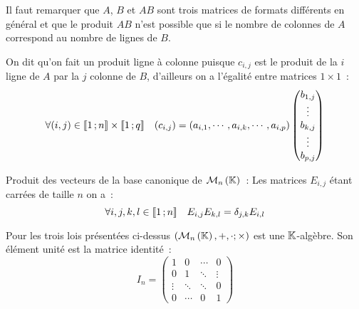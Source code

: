 Il faut remarquer que $A$, $B$ et $AB$ sont trois matrices de formats différents en général et que le produit $AB$ n'est possible que si le nombre de colonnes de $A$ correspond au nombre de lignes de $B$.

On dit qu'on fait un produit ligne à colonne puisque $c_{i,j}$ est le produit de la $i$\ieme{} ligne de $A$ par la $j$\ieme{} colonne de $B$, d'ailleurs on a l'égalité entre matrices $1 \times 1$~:
\begin{equation}
	\forall (i,j) \in \mathopen{\llbracket}1\mathclose{}\mathpunct{};n\mathclose{\rrbracket} \times \mathopen{\llbracket}1\mathclose{}\mathpunct{};q\mathclose{\rrbracket} \quad (c_{i,j}) = (a_{i,1}, \cdots, a_{i,k}, \cdots, a_{i,p}) \begin{pmatrix} b_{1,j} \\ \vdots \\b_{k,j} \\ \vdots \\b_{p,j} \end{pmatrix}
\end{equation}

Produit des vecteurs de la base canonique de $\mathcal{M}_{n}\left(\mathbb{K}\right)$~: Les matrices $E_{i,j}$ étant carrées de taille $n$ on a~:
\begin{equation}
	\forall i,j,k,l \in \mathopen{\llbracket}1\mathclose{}\mathpunct{};n\mathclose{\rrbracket} \quad E_{i,j}E_{k,l} = \delta_{j,k} E_{i,l}
\end{equation}

Pour les trois lois présentées ci-dessus $(\mathcal{M}_{n}\left(\mathbb{K}\right),+,\cdot;\times)$ est une $\mathbb{K}$-algèbre. Son élément unité est la matrice identité~:
\begin{equation}
	I_n = \begin{pmatrix}
		1 & 0 & \cdots & 0 \\
		0 & 1 & \ddots & \vdots \\
		\vdots & \ddots & \ddots & 0 \\
		0 & \cdots & 0 & 1
	\end{pmatrix}
\end{equation}